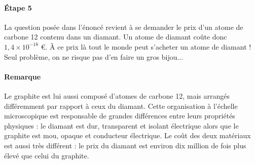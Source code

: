 \documentclass[12pt,a4paper]{article}
\begin{document}
\paragraph{Étape 5}
La question posée dans l'énoncé revient à se demander le prix d'un atome de carbone 12 contenu dans un diamant.
Un \og atome de diamant \fg{} coûte donc $1{,}4 \times 10^{-18}$ €.
À ce prix là tout le monde peut s'acheter un atome de diamant !
Seul problème, on ne risque pas d'en faire un gros bijou...

\paragraph{Remarque} Le graphite est lui aussi composé d'atomes de carbone 12, mais arrangés différemment par rapport à ceux du diamant.
Cette organisation à l'échelle microscopique est responsable de grandes différences entre leurs propriétés physiques : le diamant est dur, transparent et isolant électrique alors que le graphite est mou, opaque et conducteur électrique.
Le coût des deux matériaux est aussi très différent : le prix du diamant est environ dix million de fois plus élevé que celui du graphite.
\end{document}
